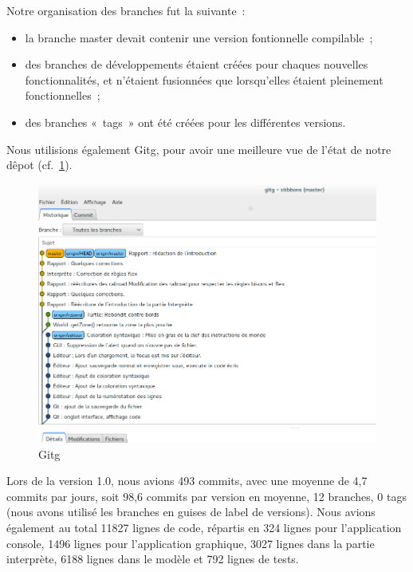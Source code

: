 Notre organisation des branches fut la suivante~:
\begin{itemize}
\item la branche master devait contenir une version fontionnelle compilable~;
\item des branches de développements étaient créées pour chaques nouvelles fonctionnalités, et n'étaient fusionnées que lorsqu'elles étaient pleinement fonctionnelles~;
\item des branches «~tags~» ont été créées pour les différentes versions.
\end{itemize}
Nous utilisions également Gitg, pour avoir une meilleure vue de l'état de notre dêpot (cf.~\ref{Gitg}).
\begin{figure}[h]
\centering
\includegraphics[scale=0.35]{doc/gestionProjet/gitbranche.png}
\caption{\label{Gitg} Gitg}
\end{figure}
Lors de la version 1.0, nous avions 493 commits, avec une moyenne de 4,7 commits par jours, soit 98,6 commits par version en moyenne, 12 branches, 0 tags (nous avons utilisé les branches en guises de label de versions).
Nous avions également au total 11827 lignes de code, répartis en 324 lignes pour l'application console, 1496 lignes pour l'application graphique, 3027 lignes dans la partie interprète, 6188 lignes dans le modèle et 792 lignes de tests.
